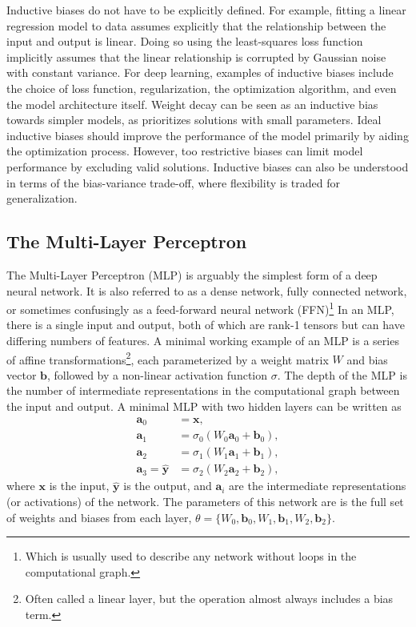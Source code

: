 Inductive biases do not have to be explicitly defined.
For example, fitting a linear regression model to data assumes explicitly that the relationship between the input and output is linear.
Doing so using the least-squares loss function implicitly assumes that the linear relationship is corrupted by Gaussian noise with constant variance.
For deep learning, examples of inductive biases include the choice of loss function, regularization, the optimization algorithm, and even the model architecture itself.
Weight decay can be seen as an inductive bias towards simpler models, as prioritizes solutions with small parameters.
Ideal inductive biases should improve the performance of the model primarily by aiding the optimization process.
However, too restrictive biases can limit model performance by excluding valid solutions.
Inductive biases can also be understood in terms of the bias-variance trade-off, where flexibility is traded for generalization.

\subsection{The Multi-Layer Perceptron}

The Multi-Layer Perceptron (MLP) is arguably the simplest form of a deep neural network.
It is also referred to as a dense network, fully connected network, or sometimes confusingly as a feed-forward neural network (FFN)\footnote{Which is usually used to describe any network without loops in the computational graph.}
In an MLP, there is a single input and output, both of which are rank-1 tensors but can have differing numbers of features.
A minimal working example of an MLP is a series of affine transformations\footnote{Often called a linear layer, but the operation almost always includes a bias term.}, each parameterized by a weight matrix $W$ and bias vector $\mathbf{b}$, followed by a non-linear activation function $\sigma$.
The depth of the MLP is the number of intermediate representations in the computational graph between the input and output.
A minimal MLP with two hidden layers can be written as
\begin{align}
    \mathbf{a}_0 &= \mathbf{x}, \\
    \mathbf{a}_1 &= \sigma_0(W_0 \mathbf{a}_0 + \mathbf{b}_0), \\
    \mathbf{a}_2 &= \sigma_1(W_1 \mathbf{a}_1 + \mathbf{b}_1), \\
    \mathbf{a}_3 = \mathbf{\hat{y}} &= \sigma_2(W_2 \mathbf{a}_2 + \mathbf{b}_2),
\end{align}
where $\mathbf{x}$ is the input, $\mathbf{\hat{y}}$ is the output, and $\mathbf{a}_i$ are the intermediate representations (or activations) of the network.
The parameters of this network are is the full set of weights and biases from each layer, $\theta = \{W_0, \mathbf{b}_0, W_1, \mathbf{b}_1, W_2, \mathbf{b}_2\}$.

